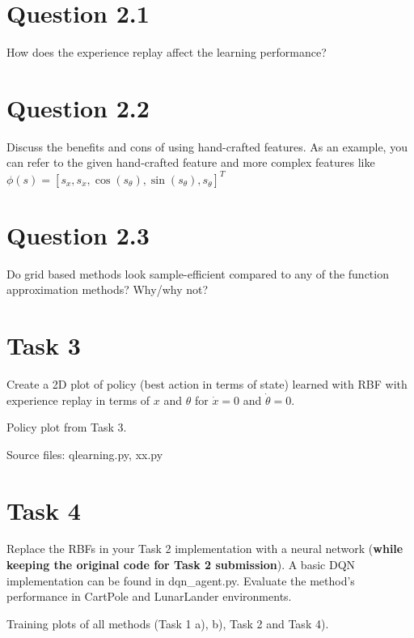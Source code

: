 \documentclass[12pt]{article}
\begin{document}
\section*{Question 2.1}

How does the experience replay affect the learning performance?

\section*{Question 2.2}

Discuss the benefits and cons of using hand-crafted features. As an example, you can refer to 
the given hand-crafted feature and more complex features like
$\phi(s) = [s_x, s_{\dot{x}}, \operatorname{cos}(s_{\theta}), \operatorname{sin}(s_{\theta}), s_{\dot{\theta}}]^T$

\section*{Question 2.3}

Do grid based methods look sample-efficient compared to any of the
function approximation methods? Why/why not?

\section*{Task 3}

Create a 2D plot of policy (best action in terms of state) learned with RBF
with experience replay in terms of $x$ and $\theta$ for $\dot{x}=0$ and $\dot{\theta}=0$.
\newline

Policy plot from Task 3.
\newline

\noindent
Source files: qlearning.py, xx.py 

\section*{Task 4}

Replace the RBFs in your Task 2 implementation with a neural network
(\textbf{while keeping the original code for Task 2 submission}). A basic DQN implementation
can be found in dqn\_agent.py. Evaluate the method’s performance in CartPole and LunarLander
environments.
\newline

Training plots of all methods (Task 1 a), b), Task 2 and Task 4).
\newline
\end{document}
